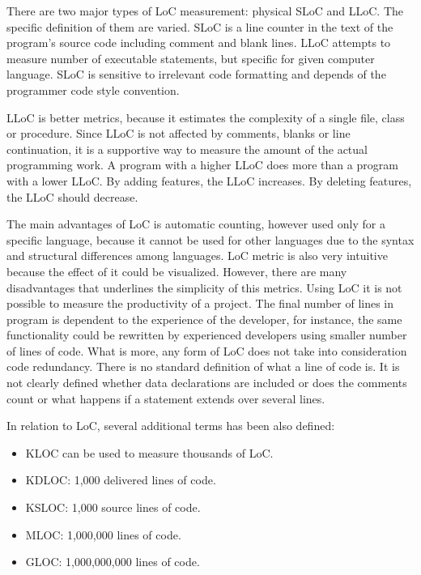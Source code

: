 There are two major types of  \ac{LoC} measurement: physical \ac{SLoC} and \ac{LLoC}. The specific definition of them are varied. \ac{SLoC} is a line counter in the text of the program's source code including comment and blank lines. \ac{LLoC} attempts to measure number of executable statements, but specific for given computer language. \ac{SLoC} is sensitive to irrelevant code formatting and depends of the programmer code style convention. 

\ac{LLoC} is better metrics, because it estimates the complexity of a single file, class or procedure. Since \ac{LLoC} is not affected by comments, blanks or line continuation, it is a supportive way to measure the amount of the actual programming work. A program with a higher \ac{LLoC} does more than a program with a lower \ac{LLoC}. By adding features, the \ac{LLoC} increases. By deleting features, the \ac{LLoC} should decrease. 

The main advantages of \ac{LoC} is automatic counting,  however used only for a specific language, because it cannot be used for other languages due to the syntax and structural differences among languages.  \ac{LoC} metric is also very intuitive because the effect of it could be visualized. However, there are many disadvantages that underlines the simplicity of this metrics. Using \ac{LoC} it is not possible to measure the productivity of a project. The final number of lines in program is dependent to the experience of the developer,  for instance, the same functionality could be rewritten by experienced developers using smaller number of lines of code. What is more, any form of \ac{LoC} does not take into consideration code redundancy.  There is no standard definition of what a line of code is. It is not clearly defined whether data declarations are included or  does the comments count or  what happens if a statement extends over several lines. 

In relation to \ac{LoC}, several additional terms has been also defined: 
\begin{itemize}
\item KLOC can be used to measure thousands of \ac{LoC}.
\item KDLOC: 1,000 delivered lines of code.
\item KSLOC: 1,000 source lines of code.
\item MLOC: 1,000,000 lines of code.
\item GLOC: 1,000,000,000 lines of code.
\end{itemize}

